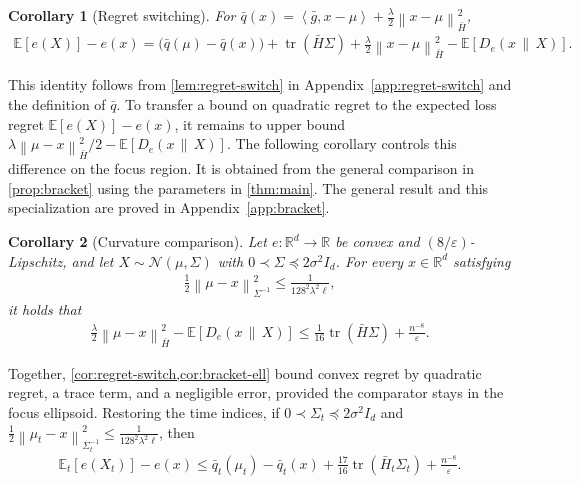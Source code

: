 \documentclass{article}
\newtheorem{corollary}[corollary]{Corollary}
\newcommand{\R}{\mathbb R}
\newcommand{\E}{\mathbb E}
\newcommand{\N}{\mathcal N}
\newcommand{\tr}{\operatorname{tr}}
\newcommand{\1}{\mathbf 1}
\newcommand{\eps}{\varepsilon}
\newcommand{\ip}[2]{\left\langle #1,#2\right\rangle}
\newcommand{\normm}[2]{\left\lVert #1\right\rVert_{#2}}
\begin{document}
\begin{corollary}[Regret switching]
    \label{cor:regret-switch}
    For
    $\bar{q}(x)=\ip{\bar{g}}{x-\mu}+\frac\lambda2\normm{x-\mu}{\bar{H}}^2$,
    \begin{align}
        \E[e(X)]-e(x)
        =
        \bigl(\bar{q}(\mu) - \bar{q}(x)\bigr)
        +\tr(\bar{H}\Sigma)
        +\frac\lambda2\normm{x-\mu}{\bar{H}}^2
        -\E[D_e(x\,\|\,X)].
        \label{eq:q-regret-switch}
    \end{align}
\end{corollary}
This identity follows from \cref{lem:regret-switch} in Appendix~\ref{app:regret-switch} and the definition of $\bar{q}$.
To transfer a bound on quadratic regret to the expected loss regret
$\E[e(X)]-e(x)$, it remains to upper bound
$\lambda\normm{\mu-x}{\bar{H}}^2/2-\E[D_e(x\,\|\,X)]$.
The following corollary controls this difference on the focus region.
It is obtained from the general comparison in \cref{prop:bracket} using the parameters in \cref{thm:main}.
The general result and this specialization are proved in Appendix~\ref{app:bracket}.

\begin{corollary}[Curvature comparison]
    \label{cor:bracket-ell}
    Let $e:\R^d\to\R$ be convex and
    $(8/\eps)$-Lipschitz, and let $X\sim\N(\mu,\Sigma)$ with
    $0\prec\Sigma\preceq2\sigma^2I_d$.
    For every $x\in\R^d$ satisfying
    \begin{align}
        \frac12\normm{\mu-x}{\Sigma^{-1}}^2
        \leq\frac{1}{128^2\lambda^2\ell},
        \label{eq:bracket-ell-focus}
    \end{align}
    it holds that
    \begin{align}
        \frac\lambda2\normm{\mu-x}{\bar{H}}^2
        -\E[D_e(x\,\|\,X)]
        \leq\frac1{16}\tr(\bar{H}\Sigma)
        +\frac{n^{-8}}{\eps}.
        \label{eq:bracket-ell}
    \end{align}
\end{corollary}

Together, \cref{cor:regret-switch,cor:bracket-ell} bound convex regret by
quadratic regret, a trace term, and a negligible error, provided the comparator
stays in the focus ellipsoid. Restoring the time indices, if
$0\prec\Sigma_t\preceq2\sigma^2I_d$ and
$\frac12\normm{\mu_t-x}{\Sigma_t^{-1}}^2\leq\frac{1}{128^2\lambda^2\ell}$, then
\begin{align}
    \E_t[e(X_t)]-e(x)
    \leq \bar{q}_t(\mu_t)-\bar{q}_t(x)
    +\frac{17}{16}\tr(\bar{H}_t\Sigma_t)
    +\frac{n^{-8}}{\eps}.
    \label{eq:time-indexed-regret-switch}
\end{align}
\end{document}
